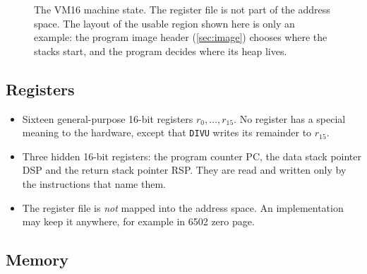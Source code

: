 \documentclass[11pt,a4paper]{article}
\newcommand{\vm}{VM16}
\newcommand{\op}[1]{\texttt{#1}}
\newcommand{\R}[1]{r_{#1}}
\begin{document}
\begin{figure}[h]
\caption{The \vm{} machine state. The register file is not part of the
address space. The layout of the usable region shown here is only an example:
the program image header (\cref{sec:image}) chooses where the stacks start, and
the program decides where its heap lives.}
\label{fig:state}
\end{figure}

\subsection{Registers}

\begin{itemize}
\item Sixteen general-purpose 16-bit registers $\R{0},\dots,\R{15}$. No
  register has a special meaning to the hardware, except that \op{DIVU}
  writes its remainder to $\R{15}$.
\item Three hidden 16-bit registers: the program counter PC, the data stack
  pointer DSP and the return stack pointer RSP. They are read and written only
  by the instructions that name them.
\item The register file is \emph{not} mapped into the address space. An
  implementation may keep it anywhere, for example in 6502 zero page.
\end{itemize}

\subsection{Memory}
\end{document}
